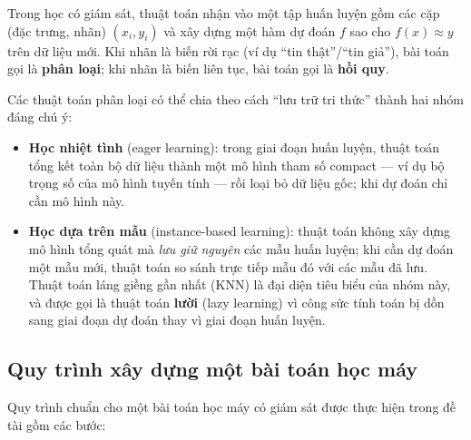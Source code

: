 Trong học có giám sát, thuật toán nhận vào một tập huấn luyện gồm các cặp (đặc trưng, nhãn) $(x_i, y_i)$ và xây dựng một hàm dự đoán $f$ sao cho $f(x) \approx y$ trên dữ liệu mới. Khi nhãn là biến rời rạc (ví dụ ``tin thật''/``tin giả''), bài toán gọi là \textbf{phân loại}; khi nhãn là biến liên tục, bài toán gọi là \textbf{hồi quy}.

Các thuật toán phân loại có thể chia theo cách ``lưu trữ tri thức'' thành hai nhóm đáng chú ý:

\begin{itemize}
    \item \textbf{Học nhiệt tình} (eager learning): trong giai đoạn huấn luyện, thuật toán tổng kết toàn bộ dữ liệu thành một mô hình tham số compact --- ví dụ bộ trọng số của mô hình tuyến tính --- rồi loại bỏ dữ liệu gốc; khi dự đoán chỉ cần mô hình này.
    \item \textbf{Học dựa trên mẫu} (instance-based learning): thuật toán không xây dựng mô hình tổng quát mà \textit{lưu giữ nguyên} các mẫu huấn luyện; khi cần dự đoán một mẫu mới, thuật toán so sánh trực tiếp mẫu đó với các mẫu đã lưu. Thuật toán láng giềng gần nhất (KNN) là đại diện tiêu biểu của nhóm này, và được gọi là thuật toán \textbf{lười} (lazy learning) vì công sức tính toán bị dồn sang giai đoạn dự đoán thay vì giai đoạn huấn luyện.
\end{itemize}

\subsection{Quy trình xây dựng một bài toán học máy}

Quy trình chuẩn cho một bài toán học máy có giám sát được thực hiện trong đề tài gồm các bước:

